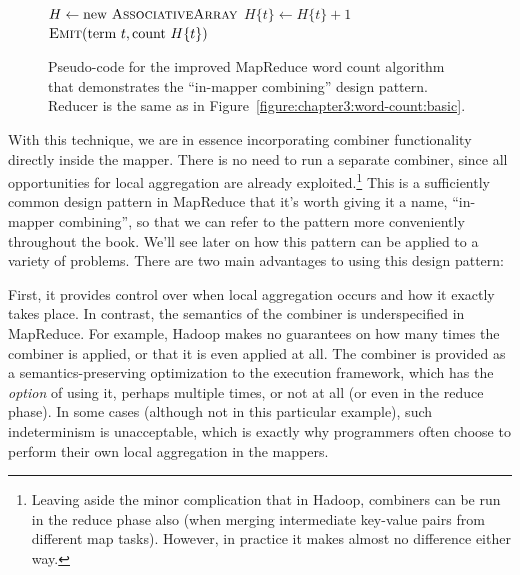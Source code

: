 \begin{figure}[t]
\algrenewcommand{}
\algrenewcommand{}
  \begin{algorithmic}[1]
    \State $H \gets \textrm{new }\textsc{AssociativeArray}$
    \EndProcedure
    \State $H\{t\} \gets H\{t\} + 1$
    \EndFor
    \EndProcedure
    \State $\textsc{Emit}(\textrm{term }t, \textrm{count }H\{t\} )$
    \EndFor
    \EndProcedure
    \EndFunction
  \end{algorithmic}
  \caption{Pseudo-code for the improved MapReduce word count algorithm
    that demonstrates the ``in-mapper combining'' design pattern.
    Reducer is the same as in
    Figure~\ref{figure:chapter3:word-count:basic}.}
\label{figure:chapter3:word-count:outer-hash}
\end{figure}

With this technique, we are in essence incorporating combiner
functionality directly inside the mapper.  There is no need to run a
separate combiner, since all opportunities for local aggregation are
already exploited.\footnote{Leaving aside the minor complication that
  in Hadoop, combiners can be run in the reduce phase also (when
  merging intermediate key-value pairs from different map tasks).
  However, in practice it makes almost no difference either way.} This
is a sufficiently common design pattern in MapReduce that it's worth
giving it a name, ``in-mapper combining'', so that we can refer to the
pattern more conveniently throughout the book.  We'll see later on how
this pattern can be applied to a variety of problems.  There are two
main advantages to using this design pattern:

First, it provides control over when local aggregation occurs and how
it exactly takes place.  In contrast, the semantics of the combiner is
underspecified in MapReduce.  For example, Hadoop makes no guarantees
on how many times the combiner is applied, or that it is even applied
at all.  The combiner is provided as a semantics-preserving
optimization to the execution framework, which has the \emph{option} of
using it, perhaps multiple times, or not at all (or even in the reduce
phase).  In some cases (although not in this particular example), such
indeterminism is unacceptable, which is exactly why programmers often
choose to perform their own local aggregation in the mappers.

